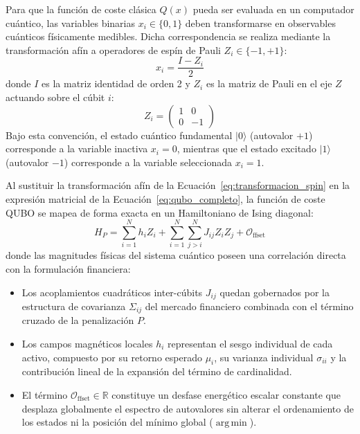 Para que la función de coste clásica $Q(x)$ pueda ser evaluada en un computador cuántico, las variables binarias $x_i \in \{0, 1\}$ deben transformarse en observables cuánticos físicamente medibles. Dicha correspondencia se realiza mediante la transformación afín a operadores de espín de Pauli $Z_i \in \{-1, +1\}$:
\begin{equation}
    x_i = \frac{I - Z_i}{2}
    \label{eq:transformacion_spin}
\end{equation}
donde $I$ es la matriz identidad de orden 2 y $Z_i$ es la matriz de Pauli en el eje $Z$ actuando sobre el cúbit $i$:
\begin{equation}
    Z_i = \begin{pmatrix} 1 & 0 \\ 0 & -1 \end{pmatrix}
\end{equation}
Bajo esta convención, el estado cuántico fundamental $|0\rangle$ (autovalor $+1$) corresponde a la variable inactiva $x_i = 0$, mientras que el estado excitado $|1\rangle$ (autovalor $-1$) corresponde a la variable seleccionada $x_i = 1$.

Al sustituir la transformación afín de la Ecuación~\eqref{eq:transformacion_spin} en la expresión matricial de la Ecuación~\eqref{eq:qubo_completo}, la función de coste QUBO se mapea de forma exacta en un Hamiltoniano de Ising diagonal:
\begin{equation}
    H_P = \sum_{i=1}^N h_i Z_i + \sum_{i=1}^N \sum_{j > i}^N J_{ij} Z_i Z_j + \mathcal{O}_{\text{ffset}}
    \label{eq:hamiltoniano_ising}
\end{equation}
donde las magnitudes físicas del sistema cuántico poseen una correlación directa con la formulación financiera:
\begin{itemize}
    \item Los acoplamientos cuadráticos inter-cúbits $J_{ij}$ quedan gobernados por la estructura de covarianza $\Sigma_{ij}$ del mercado financiero combinada con el término cruzado de la penalización $P$.
    \item Los campos magnéticos locales $h_i$ representan el sesgo individual de cada activo, compuesto por su retorno esperado $\mu_i$, su varianza individual $\sigma_{ii}$ y la contribución lineal de la expansión del término de cardinalidad.
    \item El término $\mathcal{O}_{\text{ffset}} \in \mathbb{R}$ constituye un desfase energético escalar constante que desplaza globalmente el espectro de autovalores sin alterar el ordenamiento de los estados ni la posición del mínimo global ($\operatorname{arg\,min}$).
\end{itemize}

